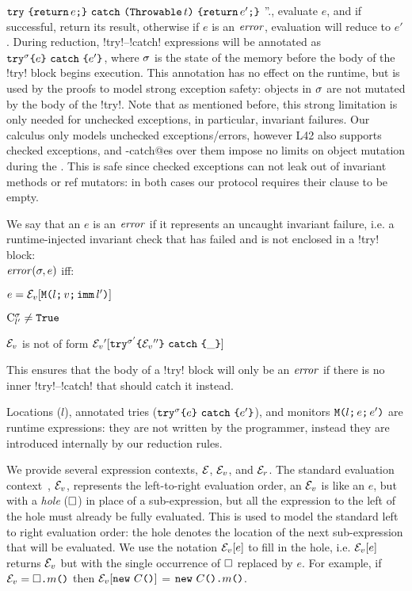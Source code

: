 \begin{itemize}
{		$\Kw{try}\ %
			\oC\Kw{return}\,e\semiColon\cC\ %
		\Kw{catch}\ %
			\oR\Kw{Throwable}\, t\cR\ %
			\oC\Kw{return}\,e'\semiColon\cC$%
		''.},
		evaluate $e$, and if successful, return its result, otherwise if $e$ is an $\mathit{error}$, evaluation will reduce to $e'$.
	During reduction, \Q!try!--\Q!catch! expressions will be annotated as $\texttt{try}^{\sigma}\texttt{\{} e\texttt{\}}\ \texttt{catch}\ \texttt{\{} e'\texttt{\}}$, where $\sigma$ is the state of the memory before the body of the \Q!try! block begins execution. This annotation has no effect on the runtime, but is used by the proofs to model strong exception safety: objects in $\sigma$ are not mutated by the body of the \Q!try!. Note that as mentioned before, this strong limitation is only needed for unchecked exceptions, in particular, invariant failures. Our calculus only models unchecked exceptions/errors, however L42 also supports checked exceptions, and \Q@try-catch@es over them impose no limits on object mutation during the \Q@try@.
    This is safe since checked exceptions can not leak out of invariant methods or ref mutators: in both cases our protocol requires their \Q@throws@ clause to be empty.

\end{itemize}

We say that an $e$ is an $\mathit{error}$ if it represents an uncaught invariant failure, i.e. a runtime-injected invariant check that has failed and is not enclosed in a \Q!try! block:\\
\indent $\mathit{error}(\sigma, e)$ iff:
\begin{iitemize}
	\item $e = \mathcal{E}_v{}[\texttt{M}\texttt{(}{}l\texttt{;}\,v\texttt{;}\,\texttt{imm}\,l'\texttt{)}]$\SS
	\item $\mathrm{C}^{\sigma}_{l'} \neq \texttt{True}$\SS
	\item $\mathcal{E}_v{}$ is not of form $\mathcal{E}_v{}'[\texttt{try}^{\sigma'}\texttt{\{}\mathcal{E}_v{}''\texttt{\}}\ \texttt{catch}\ \texttt{\{}\_\texttt{\}}]$
\end{iitemize}
This ensures that the body of a \Q!try! block will only be an $\mathit{error}$ if there is no inner \Q!try!--\Q!catch! that should catch it instead.

Locations ($l$), annotated tries ($\texttt{try}^{\sigma}\texttt{\{} e\texttt{\}}\ \texttt{catch}\ \texttt{\{} e'\texttt{\}}$), and monitors $\texttt{M}\texttt{(}{}l\texttt{;}\,e\texttt{;}\,e'\texttt{)}$ are runtime expressions: they are not written by the programmer, instead they are introduced internally by our reduction rules.

We provide several expression contexts, $\mathcal{E}$, $\mathcal{E}_v{}$, and $\mathcal{E}_r{}$. 
The standard evaluation context~\cite[Chapter~19]{pierce2002types}, $\mathcal{E}_v{}$, represents the left-to-right evaluation order, an $\mathcal{E}_v{}$ is like an $e$, but with a \emph{hole} ($\square$) in place of a sub-expression,
	but all the expression to the left of the hole must already be fully evaluated. This is used to model the standard left to right evaluation order: the hole denotes the location of the next sub-expression that will be evaluated. We use the notation $\mathcal{E}_v{}[e]$ to fill in the hole, i.e. $\mathcal{E}_v{}[e]$ returns $\mathcal{E}_v{}$ but with the single occurrence of $\square$ replaced by $e$.
	For example, if $\mathcal{E}_v{} = \square\texttt{.} m\texttt{(}\texttt{)}$ then $\mathcal{E}_v{}[\texttt{new}\ C\texttt{(}\texttt{)}]$ = $\texttt{new}\ C\texttt{(}\texttt{)}\texttt{.} m\texttt{(}\texttt{)}$.

